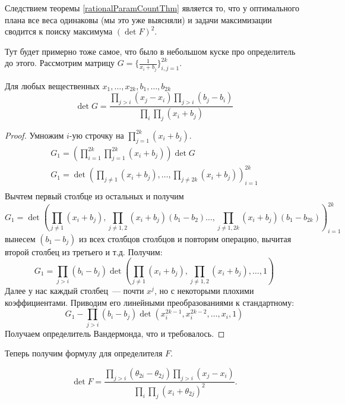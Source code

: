 Следствием теоремы \eqref{rationalParamCountThm} является то, что у оптимального плана все веса одинаковы (мы это уже выясняли) и задачи максимизации сводится к поиску максимума $(\det F)^2$.

{\color{blue} Тут будет примерно тоже самое, что было в небольшом куске про определитель до этого.}
Рассмотрим матрицу $G = \{ \frac{1}{x_i + b_j}\}_{i,j = 1}^{2k}$. 
\begin{thm}
Для любых вещественных $x_1, …, x_{2k}, b_1,…, b_{2k}$
$$\det G = \frac{\prod\limits_{j>i} (x_j-x_i) \prod\limits_{j>i}(b_j - b_i)}{\prod\limits_i\prod\limits_j (x_i + b_j)}$$
\end{thm}
\begin{proof}
Умножим $i$-ую строчку на $\prod\limits_{j=1}^{2k}(x_i+b_j)$. 
\begin{equation}
\begin{split}
G_1 = (\prod\limits_{i=1}^{2k}\prod\limits_{j=1}^{2k}(x_i+b_j)) \det G \\
G_1 = \det\left( \prod\limits_{j\neq 1} (x_i+b_j), …, \prod\limits_{j\neq 2k} (x_i+b_j)\right)_{i=1}^{2k}\\
\end{split}
\end{equation}
Вычтем первый столбце из остальных и получим
$$G_1 = \det\left( \prod\limits_{j\neq 1} (x_i+b_j),\prod\limits_{j\neq 1,2} (x_i+b_j) (b_1 - b_2) …, \prod\limits_{j\neq 1, 2k} (x_i+b_j) (b_{1} - b_{2k})\right)_{i=1}^{2k}$$
вынесем $(b_1-b_j)$ из всех столбцов столбцов и повторим операцию, вычитая второй столбец из третьего и т.д. Получим:
$$G_1 = \prod\limits_{j>i}(b_i - b_j) \det \left(\prod_{j\neq 1}(x_i + b_j), \prod\limits_{j\neq 1,2}(x_i+b_j),…,1\right)$$ 
Далее у нас каждый столбец — почти $x^j$, но с некоторыми плохими коэффициентами. Приводим его линейными преобразованиями к стандартному:
$$G_1 - \prod \limits_{j>i}(b_i - b_j) \det(x_i^{2k-1}, x_i^{2k-2},…, x_i,1)$$
Получаем определитель Вандермонда, что и требовалось.
\end{proof}

Теперь получим формулу для определителя $F$.
\begin{thm}
\begin{equation}
\label{detEquatin}
\det F = \frac{\prod\limits_{j>i}(\theta_{2i}-\theta_{2j})\prod\limits_{j>i}(x_j - x_i)}{\prod\limits_i\prod\limits_j (x_i + \theta_{2j})^2}.
\end{equation}
\end{thm}

